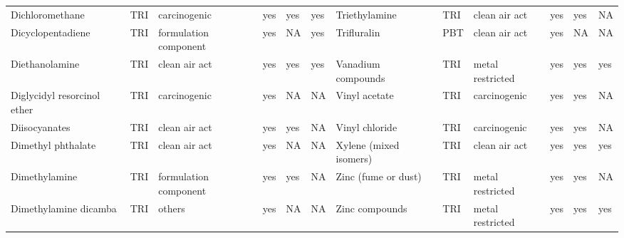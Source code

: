 \begin{table}[H]
{\begin{tabular}{llllllllllll}
            Dichloromethane                                                            & TRI            & carcinogenic          & yes    & yes     & yes  & Triethylamine                                                                                                      & TRI            & clean air act         & yes & yes & NA\\
            Dicyclopentadiene                                                          & TRI            & formulation component & yes    & NA      & yes  & Trifluralin                                                                                                        & PBT            & clean air act & yes & NA & NA\\
            Diethanolamine                                                             & TRI            & clean air act         & yes    & yes     & yes  & Vanadium compounds                                                                                                 & TRI            & metal restricted & yes & yes & yes\\
            Diglycidyl resorcinol ether                                                & TRI            & carcinogenic          & yes    & NA      & NA   & Vinyl acetate                                                                                                      & TRI            & carcinogenic & yes & yes & NA\\
            Diisocyanates                                                              & TRI            & clean air act         & yes    & yes     & NA   & Vinyl chloride                                                                                                     & TRI            & carcinogenic          & yes    & yes & NA\\
            Dimethyl phthalate                                                         & TRI            & clean air act         & yes    & NA      & NA   & Xylene (mixed isomers)                                                                                             & TRI            & clean air act & yes & yes & yes\\
            Dimethylamine                                                              & TRI            & formulation component & yes    & yes     & NA   & Zinc (fume or dust)                                                                                                & TRI            & metal restricted & yes & yes & NA\\
            Dimethylamine dicamba                                                      & TRI            & others                & yes    & NA      & NA   & Zinc compounds                                                                                                     & TRI            & metal restricted      & yes & yes & yes\\ \bottomrule\bottomrule

\end{tabular}}
\end{table}
